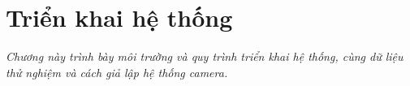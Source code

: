 \chapter{Triển khai hệ thống}
\label{chapter:trienkhai}

\textit{Chương này trình bày môi trường và quy trình triển khai hệ thống, cùng dữ liệu thử nghiệm và cách giả lập hệ thống camera.}



